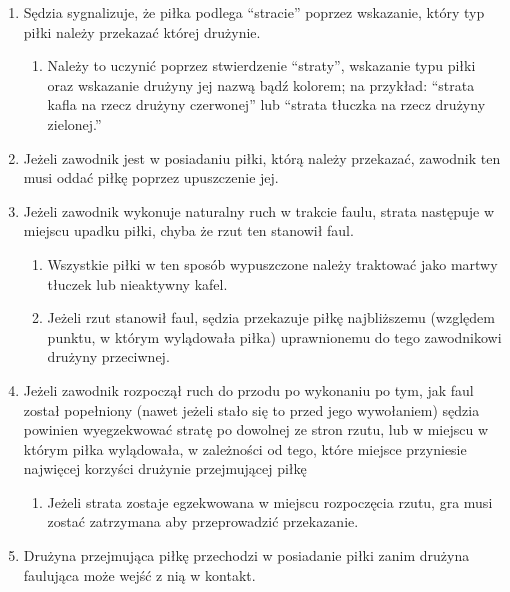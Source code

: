 \documentclass[12pt]{article}
\begin{document}
\begin{enumerate}
\item
    Sędzia sygnalizuje, że piłka podlega ``stracie'' poprzez wskazanie,
  który typ piłki należy przekazać której drużynie.
  
  \begin{enumerate}
  \item
        Należy to uczynić poprzez stwierdzenie ``straty'', wskazanie typu
    piłki oraz wskazanie drużyny jej nazwą bądź kolorem; na przykład:
    ``strata kafla na rzecz drużyny czerwonej'' lub ``strata tłuczka na
    rzecz drużyny zielonej.''
      \end{enumerate}
\item
    Jeżeli zawodnik jest w posiadaniu piłki, którą należy przekazać,
  zawodnik ten musi oddać piłkę poprzez upuszczenie jej.
  \item
    Jeżeli zawodnik wykonuje naturalny ruch w trakcie faulu, strata
  następuje w miejscu upadku piłki, chyba że rzut ten stanowił faul.
  
  \begin{enumerate}
  \item
        Wszystkie piłki w ten sposób wypuszczone należy traktować jako
    martwy tłuczek lub nieaktywny kafel.
      \item
        Jeżeli rzut stanowił faul, sędzia przekazuje piłkę najbliższemu
    (względem punktu, w którym wylądowała piłka) uprawnionemu do tego
    zawodnikowi drużyny przeciwnej.
      \end{enumerate}
\item
    Jeżeli zawodnik rozpoczął ruch do przodu po wykonaniu po tym, jak faul
  został popełniony (nawet jeżeli stało się to przed jego wywołaniem)
  sędzia powinien wyegzekwować stratę po dowolnej ze stron rzutu, lub w
  miejscu w którym piłka wylądowała, w zależności od tego, które miejsce
  przyniesie najwięcej korzyści drużynie przejmującej piłkę
  
  \begin{enumerate}
  \item
        Jeżeli strata zostaje egzekwowana w miejscu rozpoczęcia rzutu, gra
    musi zostać zatrzymana aby przeprowadzić przekazanie.
      \end{enumerate}
\item
    Drużyna przejmująca piłkę przechodzi w posiadanie piłki zanim drużyna
  faulująca może wejść z nią w kontakt.
  

\end{enumerate}
\end{document}

